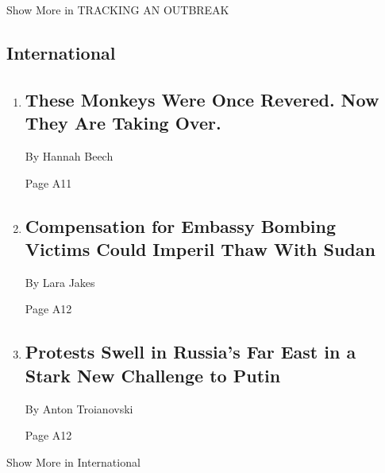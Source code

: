 Show More in TRACKING AN OUTBREAK

\hypertarget{international}{%
\subsection{International}\label{international}}

\begin{enumerate}
\def\labelenumi{\arabic{enumi}.}
\item
  \href{/2020/07/25/world/asia/thailand-monkeys.html}{}

  \hypertarget{these-monkeys-were-once-revered-now-they-are-taking-over}{%
  \subsection{These Monkeys Were Once Revered. Now They Are Taking
  Over.}\label{these-monkeys-were-once-revered-now-they-are-taking-over}}

  By Hannah Beech

  Page A11
\item
  \href{/2020/07/25/us/politics/sudan-compensation-embassy-bombings.html}{}

  \hypertarget{compensation-for-embassy-bombing-victims-could-imperil-thaw-with-sudan}{%
  \subsection{Compensation for Embassy Bombing Victims Could Imperil
  Thaw With
  Sudan}\label{compensation-for-embassy-bombing-victims-could-imperil-thaw-with-sudan}}

  By Lara Jakes

  Page A12
\item
  \href{/2020/07/25/world/europe/russia-protests-putin-khabarovsk.html}{}

  \hypertarget{protests-swell-in-russias-far-east-in-a-stark-new-challenge-to-putin}{%
  \subsection{Protests Swell in Russia's Far East in a Stark New
  Challenge to
  Putin}\label{protests-swell-in-russias-far-east-in-a-stark-new-challenge-to-putin}}

  By Anton Troianovski

  Page A12
\end{enumerate}

Show More in International

